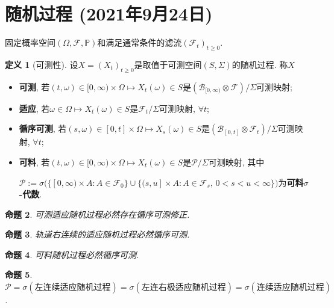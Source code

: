 \documentclass{ctexart}
\theoremstyle{definition}
\newtheorem{Def}{定义}[section]
\theoremstyle{remark}
\theoremstyle{plain}
\newtheorem{Prop}[Def]{命题}
\newcommand{\1}{\mathbbm{1}}				%
\renewcommand{\P}{\mathbb{P}}				%
\begin{document}
\section{随机过程 \normalfont\footnotesize (2021年9月24日)}
固定概率空间$(\Omega,\mathscr{F},\P)$和满足通常条件的滤流$(\mathscr{F}_{t})_{t \ge 0}$.
\begin{Def}[可测性]
设$X = (X_{t})_{t \ge 0}$是取值于可测空间$(S,\Sigma)$的随机过程. 称$X$
\begin{itemize}
	\item \textbf{可测}, 若$(t,\omega) \in [0,\infty)\times\Omega \mapsto X_{t}(\omega) \in S$是$(\mathscr{B}_{[0,\infty)}\otimes\mathscr{F})/\Sigma$可测映射;
	\item \textbf{适应}, 若$\omega \in \Omega \mapsto X_{t}(\omega) \in S$是$\mathscr{F}_{t}/\Sigma$可测映射, $\forall t$;
	\item \textbf{循序可测}, 若$(s,\omega) \in [0,t]\times\Omega \mapsto X_{s}(\omega) \in S$是$(\mathscr{B}_{[0,t]}\otimes\mathscr{F}_{t})/\Sigma$可测映射, $\forall t$;
	\item \textbf{可料}, 若$(t,\omega) \in [0,\infty)\times\Omega \mapsto X_{t}(\omega) \in S$是$\mathscr{P}/\Sigma$可测映射, 其中\par\hspace{1em}
	$\mathscr{P} := \sigma\big( \{ [0,\infty)\times A : A\in\mathscr{F}_{0} \} \cup \{ (s,u]\times A : A\in\mathscr{F}_{s} ,\, 0<s<u<\infty \} \big)$为\textbf{可料$\sigma$-代数}.
\end{itemize}
\end{Def}

\begin{Prop}
可测适应随机过程必然存在循序可测修正.
\end{Prop}

\begin{Prop}
轨道右连续的适应随机过程必然循序可测.
\end{Prop}

\begin{Prop}
可料随机过程必然循序可测.
\end{Prop}

\begin{Prop}\label{Prop:predictable}
$\mathscr{P} = \sigma(\text{左连续}\text{适应}\text{随机过程}) = \sigma(\text{左连右极}\text{适应}\text{随机过程}) = \sigma(\text{连续}\text{适应}\text{随机过程})$.
\end{Prop}
\end{document}
